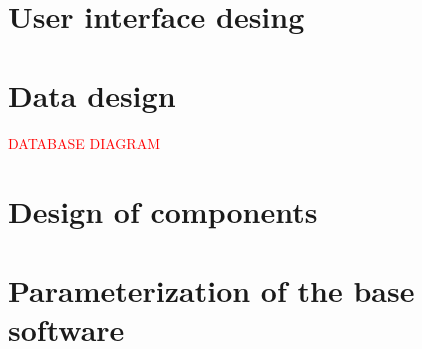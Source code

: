 %

\section{User interface desing}

\section{Data design}
\textcolor{red}{DATABASE DIAGRAM}

\section{Design of components}

\section{Parameterization of the base software}